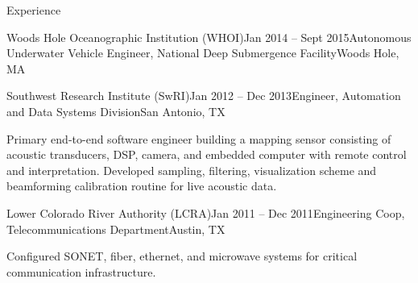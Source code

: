 \documentclass{resume} %
\begin{document}
\begin{rSection}{Experience}
\begin{rSubsection}{Woods Hole Oceanographic Institution (WHOI)}{Jan 2014 -- Sept 2015}{Autonomous Underwater Vehicle Engineer, National Deep Submergence Facility}{Woods Hole, MA}
\end{rSubsection}
	\vspace{-.2cm}
\begin{rSubsection}{Southwest Research Institute (SwRI)}{Jan 2012 -- Dec 2013}{Engineer, Automation and Data Systems Division}{San Antonio, TX}{}
\item{Primary end-to-end software engineer building a mapping sensor consisting of acoustic transducers, DSP, camera, and embedded computer with remote control and interpretation. Developed sampling, filtering, visualization scheme and beamforming calibration routine for live acoustic data.}
\end{rSubsection}
\begin{rSubsection}{Lower Colorado River Authority (LCRA)}{Jan 2011 -- Dec 2011}{Engineering Coop, Telecommunications Department}{Austin, TX}
\item{Configured SONET, fiber, ethernet, and microwave systems for critical communication infrastructure.} %
\end{rSubsection}
\end{rSection}
	\vspace{-.5cm}
% 
\end{document}
